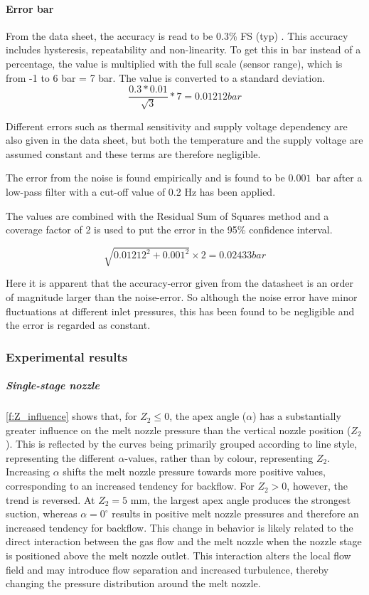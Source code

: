 \documentclass[../../main.tex]{subfiles}
\begin{document}
\paragraph{Error bar}
From the data sheet, the accuracy is read to be 0.3\% FS (typ) \cite{device.reportPressureTransmitter}. This accuracy includes hysteresis, repeatability and non-linearity. To get this in bar instead of a percentage, the value is multiplied with the full scale (sensor range), which is from -1 to 6 bar = 7 bar. The value is converted to a standard deviation.
\begin{equation}
    \frac{0.3*0.01}{\sqrt{3}}*7 = 0.01212 bar
\end{equation}

Different errors such as thermal sensitivity and supply voltage dependency are also given in the data sheet, but both the temperature and the supply voltage are assumed constant and these terms are therefore negligible.

The error from the noise is found empirically and is found to be $0.001$~bar after a low-pass filter with a cut-off value of 0.2 Hz has been applied.

The values are combined with the Residual Sum of Squares method and a coverage factor of 2 is used to put the error in the 95\% confidence interval.

\begin{equation}
    \sqrt{0.01212^2 + 0.001^2} \times2 = 0.02433 bar
\end{equation}

Here it is apparent that the accuracy-error given from the datasheet is an order of magnitude larger than the noise-error. So although the noise error have minor fluctuations at different inlet pressures, this has been found to be negligible and the error is regarded as constant.

\subsubsection{Experimental results}

\subparagraph{Single-stage nozzle}

\autoref{f:Z_influence} shows that, for \(Z_2 \leq 0\), the apex angle (\(\alpha\)) has a substantially greater influence on the melt nozzle pressure than the vertical nozzle position (\(Z_2\)). This is reflected by the curves being primarily grouped according to line style, representing the different \(\alpha\)-values, rather than by colour, representing \(Z_2\). Increasing \(\alpha\) shifts the melt nozzle pressure towards more positive values, corresponding to an increased tendency for backflow.
For \(Z_2>0\), however, the trend is reversed. At \(Z_2=5\) mm, the largest apex angle produces the strongest suction, whereas \(\alpha=0^\circ\) results in positive melt nozzle pressures and therefore an increased tendency for backflow. This change in behavior is likely related to the direct interaction between the gas flow and the melt nozzle when the nozzle stage is positioned above the melt nozzle outlet. This interaction alters the local flow field and may introduce flow separation and increased turbulence, thereby changing the pressure distribution around the melt nozzle.
\end{document}
